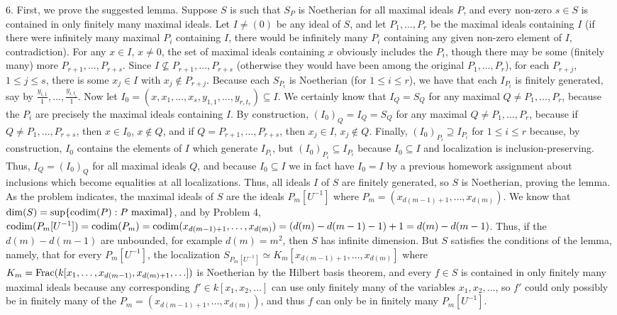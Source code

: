 \documentclass[11pt]{article}
\begin{document}
\num{6.} First, we prove the suggested lemma. Suppose $S$ is such that
$S_P$ is Noetherian for all maximal ideals $P$, and every non-zero $s\in S$
is contained in only finitely many maximal ideals. Let $I\neq(0)$ be any
ideal of $S$, and let $P_1,\ldots,P_r$ be the maximal ideals containing $I$
(if there were infinitely many maximal $P_i$ containing $I$, there would
be infinitely many $P_i$ containing any given non-zero element of $I$,
contradiction). For any $x\in I$, $x\neq0$, the set of maximal ideals
containing $x$ obviously includes the $P_i$, though there may be some
(finitely many) more $P_{r+1},\ldots,P_{r+s}$. Since $I\not\subseteq
P_{r+1},\ldots,P_{r+s}$ (otherwise they would have been among the
original $P_1,\ldots,P_r$), for each $P_{r+j}$, $1\leq j\leq s$, there
is some $x_j\in I$ with $x_j\notin P_{r+j}$. Because each $S_{P_i}$ is
Noetherian (for $1\leq i\leq r$), we have that each $I_{P_i}$ is finitely
generated, say by $\frac{y_{i,1}}{1},\ldots,\frac{y_{i,t_i}}{1}$. Now let
$I_0=(x,x_1,\ldots,x_s,y_{1,1},\ldots,y_{r,t_r})\subseteq I$. We certainly know
that $I_Q=S_Q$ for any maximal $Q\neq P_1,\ldots,P_r$, because the $P_i$ are
precisely the maximal ideals containing $I$. By construction, $(I_0)_Q=I_Q=S_Q$
for any maximal $Q\neq P_1,\ldots,P_r$, because if $Q\neq P_1,\ldots,P_{r+s}$,
then $x\in I_0$, $x\notin Q$, and if $Q=P_{r+1},\ldots,P_{r+s}$, then $x_j\in
I$, $x_j\notin Q$. Finally, $(I_0)_{P_i}\supseteq I_{P_i}$ for $1\leq i\leq r$
because, by construction, $I_0$ contains the elements of $I$ which generate
$I_{P_i}$, but $(I_0)_{P_i}\subseteq I_{P_i}$ because $I_0\subseteq I$
and localization is inclusion-preserving. Thus, $I_Q=(I_0)_Q$ for all
maximal ideals $Q$, and because $I_0\subseteq I$ we in fact have $I_0=I$
by a previous homework assignment about inclusions which become equalities
at all localizations. Thus, all ideals $I$ of $S$ are finitely generated,
so $S$ is Noetherian, proving the lemma.\\

As the problem indicates, the maximal ideals of $S$ are the
ideals $P_m[U^{-1}]$ where $P_m=(x_{d(m-1)+1},\ldots,x_{d(m)})$. We
know that $\operatorname{dim}(S)=\sup\{\operatorname{codim}(P):P\text{ maximal}\}$, and by Problem 4,
$\operatorname{codim}(P_m[U^{-1}])=\operatorname{codim}(P_m)=\operatorname{codim}(x_{d(m-1)+1},\ldots,x_{d(m)})=(d(m)-d(m-1)-1)+1=d(m)-d(m-1)$.
Thus, if the $d(m)-d(m-1)$ are unbounded, for example $d(m)=m^2$,
then $S$ has infinite dimension. But $S$ satisfies the conditions of
the lemma, namely, that for every $P_m[U^{-1}]$, the localization
$S_{P_m[U^{-1}]}\simeq K_m[x_{d(m-1)+1},\ldots,x_{d(m)}]$ where
$K_m=\operatorname{Frac}(k[x_1,\ldots,x_{d(m-1)},x_{d(m)+1},\ldots])$ is Noetherian by the
Hilbert basis theorem, and every $f\in S$ is contained in only finitely many
maximal ideals because any corresponding $f'\in k[x_1,x_2,\ldots]$ can use
only finitely many of the variables $x_1,x_2,\ldots$, so $f'$ could only
possibly be in finitely many of the $P_m=(x_{d(m-1)+1},\ldots,x_{d(m)})$,
and thus $f$ can only be in finitely many $P_m[U^{-1}]$.    \\
\end{document}
